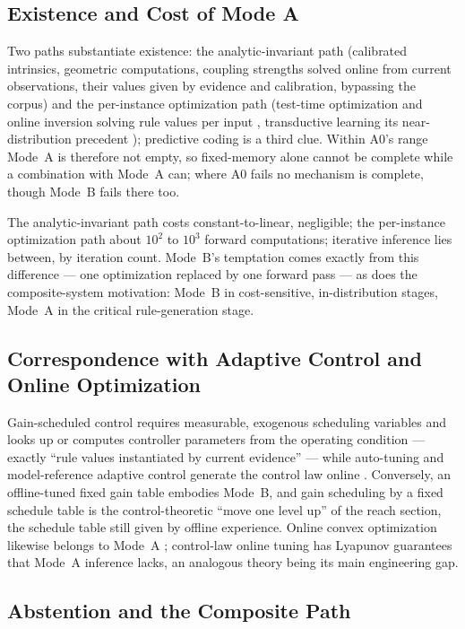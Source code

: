 \subsection{Existence and Cost of Mode A}
\label{sec:cost}

Two paths substantiate existence: the analytic-invariant path (calibrated intrinsics, geometric computations, coupling strengths solved online from current observations, their values given by evidence and calibration, bypassing the corpus) and the per-instance optimization path (test-time optimization and online inversion solving rule values per input \citep{sun2020}, transductive learning its near-distribution precedent \citep{vapnik1995}); predictive coding is a third clue. Within A0's range Mode~A is therefore not empty, so fixed-memory alone cannot be complete while a combination with Mode~A can; where A0 fails no mechanism is complete, though Mode~B fails there too.

The analytic-invariant path costs constant-to-linear, negligible; the per-instance optimization path about $10^2$ to $10^3$ forward computations; iterative inference lies between, by iteration count. Mode~B's temptation comes exactly from this difference --- one optimization replaced by one forward pass --- as does the composite-system motivation: Mode~B in cost-sensitive, in-distribution stages, Mode~A in the critical rule-generation stage.

\subsection{Correspondence with Adaptive Control and Online Optimization}

Gain-scheduled control requires measurable, exogenous scheduling variables and looks up or computes controller parameters from the operating condition --- exactly ``rule values instantiated by current evidence'' \citep{shamma1990} --- while auto-tuning and model-reference adaptive control generate the control law online \citep{astrom1995}. Conversely, an offline-tuned fixed gain table embodies Mode~B, and gain scheduling by a fixed schedule table is the control-theoretic ``move one level up'' of the reach section, the schedule table still given by offline experience. Online convex optimization likewise belongs to Mode~A \citep{hazan2016}; control-law online tuning has Lyapunov guarantees that Mode~A inference lacks, an analogous theory being its main engineering gap.

\subsection{Abstention and the Composite Path}

